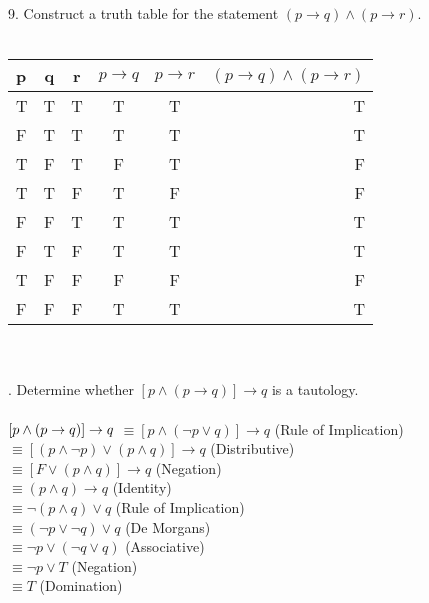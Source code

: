 \documentclass[11pt, oneside]{article}   	%
\begin{document}
9. Construct a truth table for the statement $(p\to q) \wedge (p\to r).$\\\\
\indent \begin{tabular} {| l | c | c | c | c || r |}
  \hline
  p & q & r & $p \to q$ & $p\to r$ & $(p \to q)\wedge (p\to r)$ \\ \hline
  T & T & T & T & T & T \\ \hline
  F & T & T & T & T & T\\ \hline
  T & F & T & F & T & F\\ \hline
  T & T & F & T & F & F\\ \hline
  F & F & T & T & T & T\\ \hline
  F & T & F & T & T & T\\ \hline
  T & F & F & F & F & F\\ \hline
  F & F & F & T & T & T\\ \hline
\end{tabular}\\\\

. Determine whether $[p\wedge (p\to q)]\to q$ is a tautology.\\\\
$[p\wedge (p\to q)]\to q\\$
$\equiv [p\wedge (\neg p\lor q)]\to q$ (Rule of Implication)\\
$\equiv [(p\wedge\neg p)\lor (p\wedge q)]\to q$ (Distributive) \\
$\equiv [F\lor (p\wedge q)]\to q$ (Negation)\\
$\equiv (p\wedge q)\to q$ (Identity)\\
$\equiv \neg(p\wedge q)\lor q$ (Rule of Implication)\\
$\equiv (\neg p\lor \neg q)\lor q$ (De Morgans)\\
$\equiv \neg p\lor (\neg q\lor q)$ (Associative)\\
$\equiv \neg p\lor T$ (Negation)\\
$\equiv T$ (Domination)
\end{document}
